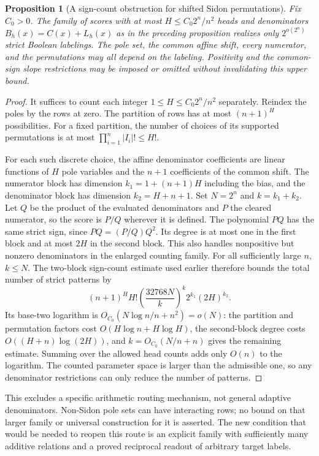 \documentclass[11pt]{article}
\newtheorem{proposition}{Proposition}
\begin{document}
\begin{proposition}[A sign-count obstruction for shifted Sidon permutations]
Fix $C_0>0$. The family of scores with at most
$H\le C_0 2^n/n^2$ heads and denominators
$B_h(x)=C(x)+L_h(x)$ as in the preceding proposition realizes only
$2^{o(2^n)}$ strict Boolean labelings. The pole set, the common affine
shift, every numerator, and the permutations may all depend on the
labeling. Positivity and the common-sign slope restrictions may be
imposed or omitted without invalidating this upper bound.
\end{proposition}
\begin{proof}
It suffices to count each integer $1\le H\le C_0 2^n/n^2$ separately.
Reindex the poles by the rows at zero. The partition of rows has at most
$(n+1)^H$ possibilities. For a fixed partition, the number of choices
of its supported permutations is at most
$\prod_{i=1}^n|I_i|!\le H!$.

For each such discrete choice, the affine denominator coefficients
are linear functions of $H$ pole variables and the $n+1$ coefficients
of the common shift. The numerator block has dimension
$k_1=1+(n+1)H$ including the bias, and the denominator block has
dimension $k_2=H+n+1$. Set $N=2^n$ and $k=k_1+k_2$.
Let $Q$ be the product of the evaluated denominators and $P$ the
cleared numerator, so the score is $P/Q$ wherever it is defined.
The polynomial $PQ$ has the same strict sign, since
$PQ=(P/Q)Q^2$. Its degree is at most one in the first block and at
most $2H$ in the second block. This also handles nonpositive but
nonzero denominators in the enlarged counting family. For all
sufficiently large $n$, $k\le N$. The two-block sign-count estimate
used earlier therefore bounds the total number of strict patterns by
\[
 (n+1)^H H!\left(\frac{32768N}{k}\right)^k
              2^{k_1}(2H)^{k_2}.
\]
Its base-two logarithm is
$O_{C_0}(N\log n/n+n^2)=o(N)$: the partition and permutation factors
cost $O(H\log n+H\log H)$, the second-block degree costs
$O((H+n)\log(2H))$, and $k=O_{C_0}(N/n+n)$ gives the remaining estimate.
Summing over the allowed head counts adds only $O(n)$ to the logarithm.
The counted parameter space is larger than the admissible one, so any
denominator restrictions can only reduce the number of patterns.
\end{proof}

This excludes a specific arithmetic routing mechanism, not general
adaptive denominators. Non-Sidon pole sets can have interacting rows;
no bound on that larger family or universal construction for it is
asserted. The new condition that would be needed to reopen this route
is an explicit family with sufficiently many additive relations and a
proved reciprocal readout of arbitrary target labels.
\end{document}
